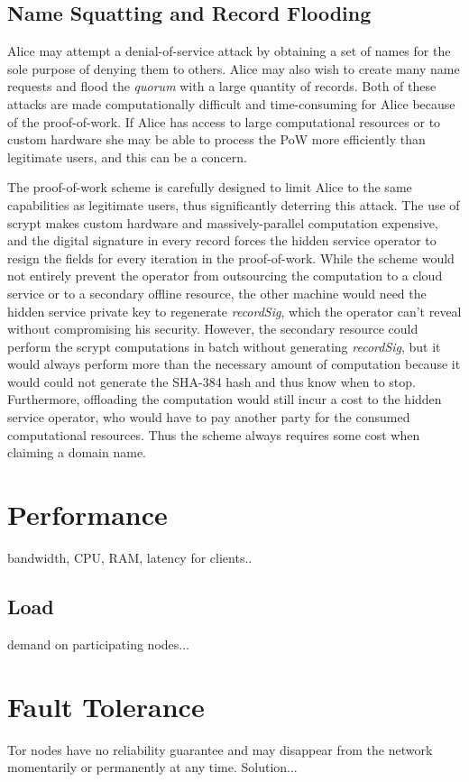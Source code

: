 \subsection{Name Squatting and Record Flooding}

Alice may attempt a denial-of-service attack by obtaining a set of names for the sole purpose of denying them to others. Alice may also wish to create many name requests and flood the \emph{quorum} with a large quantity of records. Both of these attacks are made computationally difficult and time-consuming for Alice because of the proof-of-work. If Alice has access to large computational resources or to custom hardware she may be able to process the PoW more efficiently than legitimate users, and this can be a concern.

The proof-of-work scheme is carefully designed to limit Alice to the same capabilities as legitimate users, thus significantly deterring this attack. The use of scrypt makes custom hardware and massively-parallel computation expensive, and the digital signature in every record forces the hidden service operator to resign the fields for every iteration in the proof-of-work. While the scheme would not entirely prevent the operator from outsourcing the computation to a cloud service or to a secondary offline resource, the other machine would need the hidden service private key to regenerate \emph{recordSig}, which the operator can't reveal without compromising his security. However, the secondary resource could perform the scrypt computations in batch without generating \emph{recordSig}, but it would always perform more than the necessary amount of computation because it would could not generate the SHA-384 hash and thus know when to stop. Furthermore, offloading the computation would still incur a cost to the hidden service operator, who would have to pay another party for the consumed computational resources. Thus the scheme always requires some cost when claiming a domain name. 

\section{Performance}

bandwidth, CPU, RAM, latency for clients..

\subsection{Load}

demand on participating nodes...

\section{Fault Tolerance}

Tor nodes have no reliability guarantee and may disappear from the network momentarily or permanently at any time. Solution...

